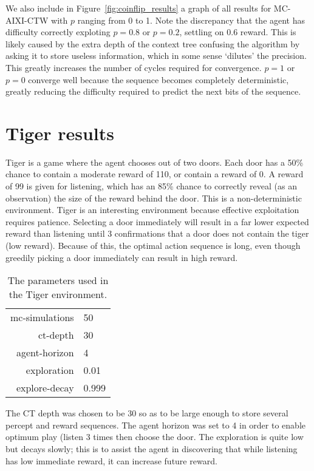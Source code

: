 \documentclass[pdftex,twoside,a4paper]{report}
\newcommand{\mac}{MC-AIXI-CTW}
\begin{document}
We also include in Figure~\ref{fig:coinflip_results} a graph of all results for \mac{} with $p$ ranging from 0 to 1. Note the discrepancy that the agent has difficulty correctly exploting $p=0.8$ or $p=0.2$, settling on 0.6 reward. This is likely caused by the extra depth of the context tree confusing the algorithm by asking it to store useless information, which in some sense `dilutes' the precision. This greatly increases the number of cycles required for convergence. $p=1$ or $p=0$ converge well because the sequence becomes completely deterministic, greatly reducing the difficulty required to predict the next bits of the sequence.

\section{Tiger results}
Tiger is a game where the agent chooses out of two doors. Each door has a 50\% chance to contain a moderate reward of 110, or contain a reward of 0. A reward of 99 is given for listening, which has an 85\% chance to correctly reveal (as an observation) the size of the reward behind the door. This is a non-deterministic environment. Tiger is an interesting environment because effective exploitation requires patience. Selecting a door immediately will result in a far lower expected reward than listening until 3 confirmations that a door does not contain the tiger (low reward). Because of this, the optimal action sequence is long, even though greedily picking a door immediately can result in high reward.

\begin{table}[h]
\begin{center}
\begin{tabular}{| r | l | }
\hline
mc-simulations & 50\\
ct-depth & 30\\
agent-horizon & 4\\
exploration & 0.01\\
explore-decay & 0.999\\
\hline
\end{tabular}
\caption{The parameters used in the Tiger environment.}
\end{center}
\end{table}

The CT depth was chosen to be 30 so as to be large enough to store several percept and reward sequences. The agent horizon was set to 4 in order to enable optimum play (listen 3 times then choose the door. The exploration is quite low but decays slowly; this is to assist the agent in discovering that while listening has low immediate reward, it can increase future reward.
\end{document}

